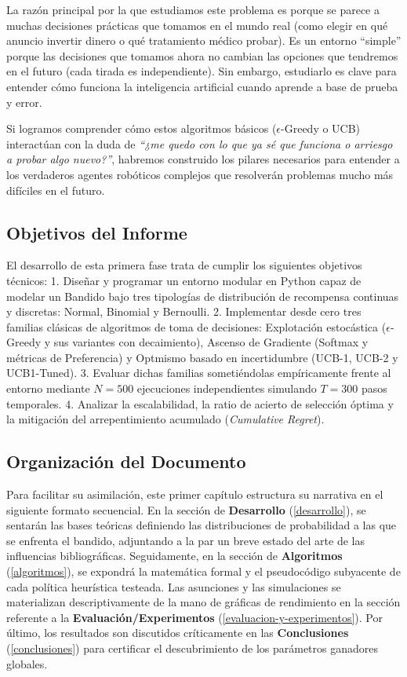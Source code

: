 La razón principal por la que estudiamos este problema es porque se
parece a muchas decisiones prácticas que tomamos en el mundo real (como
elegir en qué anuncio invertir dinero o qué tratamiento médico probar).
Es un entorno ``simple'' porque las decisiones que tomamos ahora no
cambian las opciones que tendremos en el futuro (cada tirada es
independiente). Sin embargo, estudiarlo es clave para entender cómo
funciona la inteligencia artificial cuando aprende a base de prueba y
error.

Si logramos comprender cómo estos algoritmos básicos
(\(\epsilon\)-Greedy o UCB) interactúan con la duda de \emph{``¿me quedo
con lo que ya sé que funciona o arriesgo a probar algo nuevo?''},
habremos construido los pilares necesarios para entender a los
verdaderos agentes robóticos complejos que resolverán problemas mucho
más difíciles en el futuro.

\subsection{Objetivos del Informe}\label{objetivos-del-informe}

El desarrollo de esta primera fase trata de cumplir los siguientes
objetivos técnicos: 1. Diseñar y programar un entorno modular en Python
capaz de modelar un Bandido bajo tres tipologías de distribución de
recompensa continuas y discretas: Normal, Binomial y Bernoulli. 2.
Implementar desde cero tres familias clásicas de algoritmos de toma de
decisiones: Explotación estocástica (\(\epsilon\)-Greedy y sus variantes
con decaimiento), Ascenso de Gradiente (Softmax y métricas de
Preferencia) y Optmismo basado en incertidumbre (UCB-1, UCB-2 y
UCB1-Tuned). 3. Evaluar dichas familias sometiéndolas empíricamente
frente al entorno mediante \(N=500\) ejecuciones independientes
simulando \(T=300\) pasos temporales. 4. Analizar la escalabilidad, la
ratio de acierto de selección óptima y la mitigación del arrepentimiento
acumulado (\emph{Cumulative Regret}).

\subsection{Organización del
Documento}\label{organizacion-del-documento}

Para facilitar su asimilación, este primer capítulo estructura su
narrativa en el siguiente formato secuencial. En la sección de
\textbf{Desarrollo} (\ref{desarrollo}), se sentarán las bases teóricas definiendo las distribuciones de probabilidad a las que se enfrenta
el bandido, adjuntando a la par un breve estado del arte de las
influencias bibliográficas. Seguidamente, en la sección de
\textbf{Algoritmos} (\ref{algoritmos}), se expondrá la matemática formal y el
pseudocódigo subyacente de cada política heurística testeada. Las
asunciones y las simulaciones se materializan descriptivamente de la
mano de gráficas de rendimiento en la sección referente a la
\textbf{Evaluación/Experimentos} (\ref{evaluacion-y-experimentos}). Por último, los resultados son
discutidos críticamente en las \textbf{Conclusiones} (\ref{conclusiones}) para
certificar el descubrimiento de los parámetros ganadores globales.

